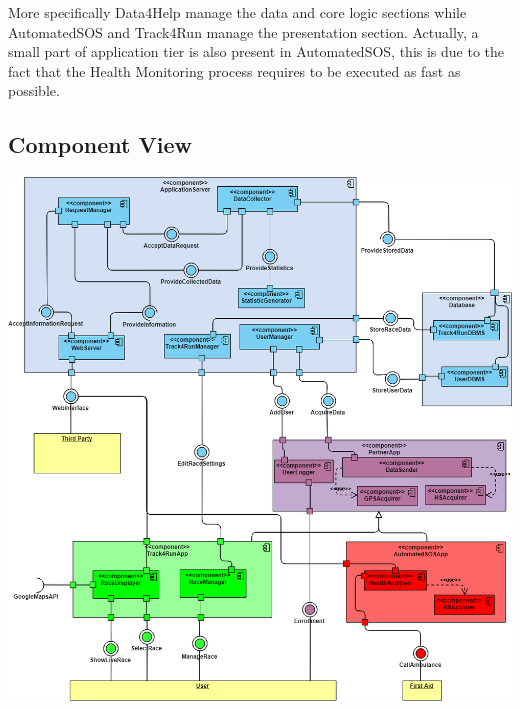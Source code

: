 More specifically Data4Help manage the data and core logic sections while AutomatedSOS and Track4Run manage the presentation section. Actually, a small part of application tier is also present in AutomatedSOS, this is due to the fact that the Health Monitoring process requires to be executed as fast as possible.

\subsection{Component View}

\includegraphics[scale=0.5]{Images/ComponentDiagram.png}


